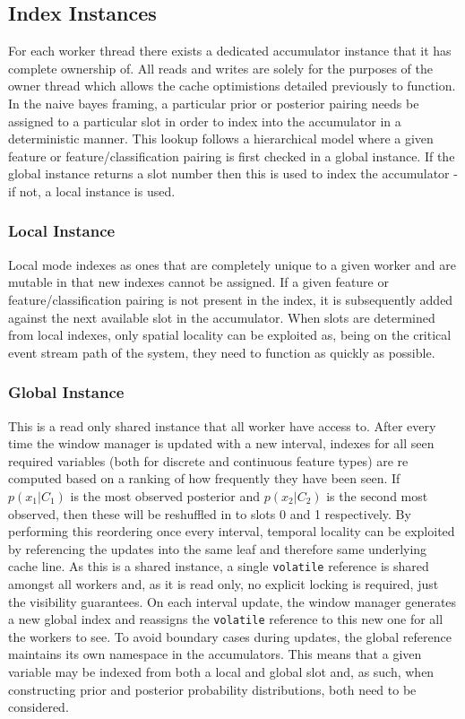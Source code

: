 \documentclass[a4paper,11pt]{scrreprt}
\begin{document}
\subsection{Index Instances}
For each worker thread there exists a dedicated accumulator instance that it has complete ownership of. All reads and writes are solely for the purposes of the owner thread which allows the cache optimistions detailed previously to function. In the naive bayes framing, a particular prior or posterior pairing needs be assigned to a particular slot in order to index into the accumulator in a deterministic manner. This lookup follows a hierarchical model where a given feature or feature/classification pairing is first checked in a global instance. If the global instance returns a slot number then this is used to index the accumulator - if not, a local instance is used.
\subsubsection{Local Instance}
Local mode indexes as ones that are completely unique to a given worker and are mutable in that new indexes cannot be assigned. If a given feature or feature/classification pairing is not present in the index, it is subsequently added against the next available slot in the accumulator. When slots are determined from local indexes, only spatial locality can be exploited as, being on the critical event stream path of the system, they need to function as quickly as possible.
\subsubsection{Global Instance}
This is a read only shared instance that all worker have access to. After every time the window manager is updated with a new interval, indexes for all seen required variables (both for discrete and continuous feature types) are re computed based on a ranking of how frequently they have been seen. If \(p(x_1 | C_1)\) is the most observed posterior and \(p(x_2 | C_2)\) is the second most observed, then these will be reshuffled in to slots 0 and 1 respectively. By performing this reordering once every interval, temporal locality can be exploited by referencing the updates into the same leaf and therefore same underlying cache line. As this is a shared instance, a single \texttt{volatile} reference is shared amongst all workers and, as it is read only, no explicit locking is required, just the visibility guarantees. On each interval update, the window manager generates a new global index and reassigns the \texttt{volatile} reference to this new one for all the workers to see. To avoid boundary cases during updates, the global reference maintains its own namespace in the accumulators. This means that a given variable may be indexed from both a local and global slot and, as such, when constructing prior and posterior probability distributions, both need to be considered.
\end{document}
